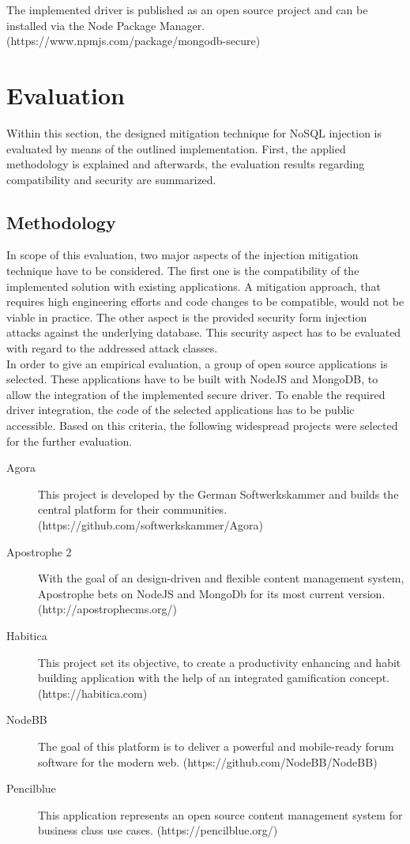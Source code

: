 The implemented driver is published as an open source project and can be installed via the Node Package Manager. (https://www.npmjs.com/package/mongodb-secure)


\section{Evaluation}
\label{sec:evaluation}
Within this section, the designed mitigation technique for NoSQL injection is evaluated by means of the outlined implementation. First, the applied methodology is explained and afterwards, the evaluation results regarding compatibility and security are summarized.

\subsection{Methodology}
In scope of this evaluation, two major aspects of the injection mitigation technique have to be considered. The first one is the compatibility of the implemented solution with existing applications. A mitigation approach, that requires high engineering efforts and code changes to be compatible, would not be viable in practice. The other aspect is the provided security form injection attacks against the underlying database. This security aspect has to be evaluated with regard to the addressed attack classes. \\

In order to give an empirical evaluation, a group of open source applications is selected. These applications have to be built with NodeJS and MongoDB, to allow the integration of the implemented secure driver. To enable the required driver integration, the code of the selected applications has to be public accessible. Based on this criteria, the following widespread projects were selected for the further evaluation.

\begin{description}
\item [Agora] This project is developed by the German Softwerkskammer and builds the central platform for their communities. (https://github.com/softwerkskammer/Agora)
\item [Apostrophe 2] With the goal of an design-driven and flexible content management system, Apostrophe bets on NodeJS and MongoDb for its most current version. (http://apostrophecms.org/)
\item [Habitica] This project set its objective, to create a productivity enhancing and habit building application with the help of an integrated gamification concept. (https://habitica.com)
\item [NodeBB] The goal of this platform is to deliver a powerful and mobile-ready forum software for the modern web. (https://github.com/NodeBB/NodeBB)
\item [Pencilblue] This application represents an open source content management system for business class use cases. (https://pencilblue.org/)
\end{description}

